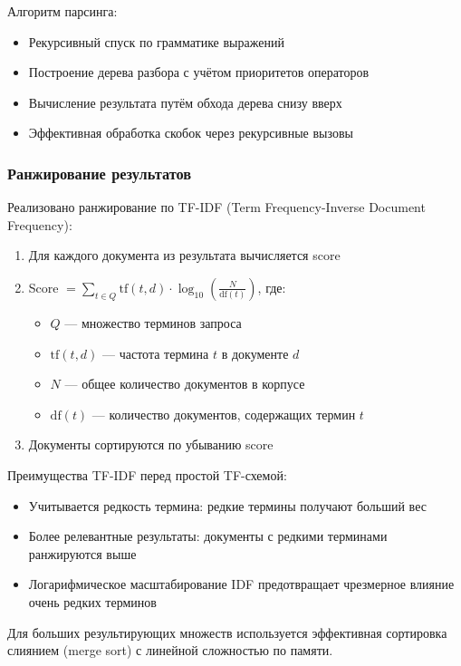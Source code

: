 Алгоритм парсинга:
\begin{itemize}
    \item Рекурсивный спуск по грамматике выражений
    \item Построение дерева разбора с учётом приоритетов операторов
    \item Вычисление результата путём обхода дерева снизу вверх
    \item Эффективная обработка скобок через рекурсивные вызовы
\end{itemize}

\subsubsection{Ранжирование результатов}

Реализовано ранжирование по TF-IDF (Term Frequency-Inverse Document Frequency):
\begin{enumerate}
    \item Для каждого документа из результата вычисляется score
    \item Score $= \sum_{t \in Q} \text{tf}(t, d) \cdot \log_{10}\left(\frac{N}{\text{df}(t)}\right)$, где:
    \begin{itemize}
        \item $Q$ --- множество терминов запроса
        \item $\text{tf}(t, d)$ --- частота термина $t$ в документе $d$
        \item $N$ --- общее количество документов в корпусе
        \item $\text{df}(t)$ --- количество документов, содержащих термин $t$
    \end{itemize}
    \item Документы сортируются по убыванию score
\end{enumerate}

Преимущества TF-IDF перед простой TF-схемой:
\begin{itemize}
    \item Учитывается редкость термина: редкие термины получают больший вес
    \item Более релевантные результаты: документы с редкими терминами ранжируются выше
    \item Логарифмическое масштабирование IDF предотвращает чрезмерное влияние очень редких терминов
\end{itemize}

Для больших результирующих множеств используется эффективная сортировка слиянием (merge sort) с линейной сложностью по памяти.

